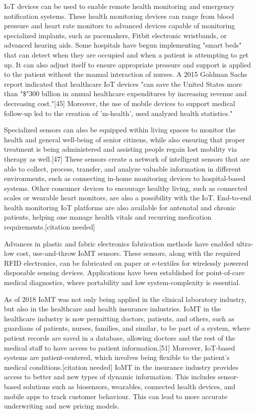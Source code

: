 \documentclass[12pt, a4paper, twoside]{article}
\begin{document}
IoT devices can be used to enable remote health monitoring and emergency notification systems. These health monitoring devices can range from blood pressure and heart rate monitors to advanced devices capable of monitoring specialized implants, such as pacemakers, Fitbit electronic wristbands, or advanced hearing aids. Some hospitals have begun implementing "smart beds" that can detect when they are occupied and when a patient is attempting to get up. It can also adjust itself to ensure appropriate pressure and support is applied to the patient without the manual interaction of nurses. A 2015 Goldman Sachs report indicated that healthcare IoT devices "can save the United States more than "\$"300 billion in annual healthcare expenditures by increasing revenue and decreasing cost."[45] Moreover, the use of mobile devices to support medical follow-up led to the creation of 'm-health', used analyzed health statistics."

Specialized sensors can also be equipped within living spaces to monitor the health and general well-being of senior citizens, while also ensuring that proper treatment is being administered and assisting people regain lost mobility via therapy as well.[47] These sensors create a network of intelligent sensors that are able to collect, process, transfer, and analyze valuable information in different environments, such as connecting in-home monitoring devices to hospital-based systems. Other consumer devices to encourage healthy living, such as connected scales or wearable heart monitors, are also a possibility with the IoT. End-to-end health monitoring IoT platforms are also available for antenatal and chronic patients, helping one manage health vitals and recurring medication requirements.[citation needed]

Advances in plastic and fabric electronics fabrication methods have enabled ultra-low cost, use-and-throw IoMT sensors. These sensors, along with the required RFID electronics, can be fabricated on paper or e-textiles for wirelessly powered disposable sensing devices. Applications have been established for point-of-care medical diagnostics, where portability and low system-complexity is essential.

As of 2018 IoMT was not only being applied in the clinical laboratory industry, but also in the healthcare and health insurance industries. IoMT in the healthcare industry is now permitting doctors, patients, and others, such as guardians of patients, nurses, families, and similar, to be part of a system, where patient records are saved in a database, allowing doctors and the rest of the medical staff to have access to patient information.[51] Moreover, IoT-based systems are patient-centered, which involves being flexible to the patient's medical conditions.[citation needed] IoMT in the insurance industry provides access to better and new types of dynamic information. This includes sensor-based solutions such as biosensors, wearables, connected health devices, and mobile apps to track customer behaviour. This can lead to more accurate underwriting and new pricing models.
\end{document}
